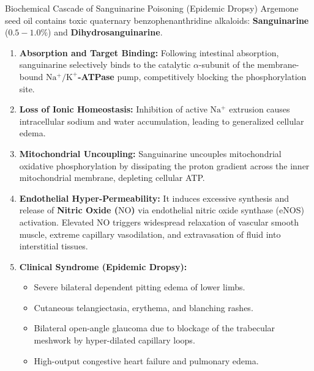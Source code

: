 \documentclass[11pt,a4paper,oneside]{article}
\begin{document}
\begin{hazardbox}{Biochemical Cascade of Sanguinarine Poisoning (Epidemic Dropsy)}
Argemone seed oil contains toxic quaternary benzophenanthridine alkaloids: \textbf{Sanguinarine} ($0.5-1.0\%$) and \textbf{Dihydrosanguinarine}.
\begin{enumerate}
    \item \textbf{Absorption and Target Binding:} Following intestinal absorption, sanguinarine selectively binds to the catalytic $\alpha$-subunit of the membrane-bound \textbf{$\mathrm{Na^+/K^+}$-ATPase} pump, competitively blocking the phosphorylation site.
    \item \textbf{Loss of Ionic Homeostasis:} Inhibition of active $\mathrm{Na^+}$ extrusion causes intracellular sodium and water accumulation, leading to generalized cellular edema.
    \item \textbf{Mitochondrial Uncoupling:} Sanguinarine uncouples mitochondrial oxidative phosphorylation by dissipating the proton gradient across the inner mitochondrial membrane, depleting cellular ATP.
    \item \textbf{Endothelial Hyper-Permeability:} It induces excessive synthesis and release of \textbf{Nitric Oxide ($\mathrm{NO}$)} via endothelial nitric oxide synthase (eNOS) activation. Elevated $\mathrm{NO}$ triggers widespread relaxation of vascular smooth muscle, extreme capillary vasodilation, and extravasation of fluid into interstitial tissues.
    \item \textbf{Clinical Syndrome (Epidemic Dropsy):}
    \begin{itemize}
        \item Severe bilateral dependent pitting edema of lower limbs.
        \item Cutaneous telangiectasia, erythema, and blanching rashes.
        \item Bilateral open-angle glaucoma due to blockage of the trabecular meshwork by hyper-dilated capillary loops.
        \item High-output congestive heart failure and pulmonary edema.
    \end{itemize}
\end{enumerate}
\end{hazardbox}
\end{document}
